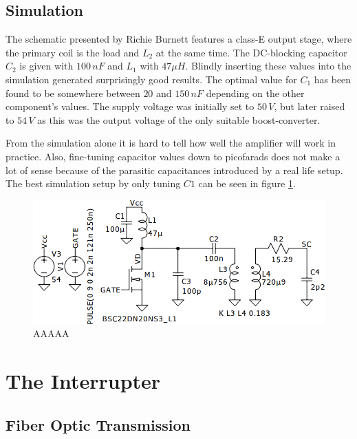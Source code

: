 \subsection{Simulation}

The schematic presented by Richie Burnett features a class-E output stage, where the primary coil is the load and \(L_2\) at the same time. The DC-blocking capacitor \(C_2\) is given with \(100\,nF\) and \(L_1\) with \(47\mu H\). Blindly inserting these values into the simulation generated surprisingly good results. The optimal value for \(C_1\) has been found to be somewhere between \(20\) and \(150\,nF\) depending on the other component's values. The supply voltage was initially set to \(50\,V\), but later raised to \(54\,V\) as this was the output voltage of the only suitable boost-converter.

From the simulation alone it is hard to tell how well the amplifier will work in practice. Also, fine-tuning capacitor values down to picofarads does not make a lot of sense because of the parasitic capacitances introduced by a real life setup. The best simulation setup by only tuning \(C1\) can be seen in figure \ref{fig:ltspice-complete}.

\begin{figure}[h!]
    \centering
    \includegraphics[width=\textwidth]{simon/resources/ltspice-complete.png}
    \caption{AAAAA}
    \label{fig:ltspice-complete}
\end{figure}



\section{The Interrupter}

\subsection{Fiber Optic Transmission}

